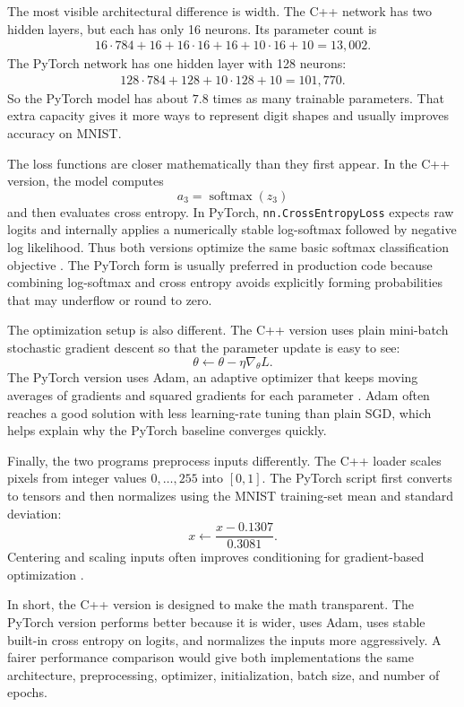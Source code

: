 \documentclass[11pt]{article}
\newcommand{\softmax}{\operatorname{softmax}}
\begin{document}
The most visible architectural difference is width. The C++ network has two
hidden layers, but each has only 16 neurons. Its parameter count is
\[
\begin{aligned}
    16 \cdot 784 + 16
    + 16 \cdot 16 + 16
    + 10 \cdot 16 + 10
    = 13{,}002.
\end{aligned}
\]
The PyTorch network has one hidden layer with 128 neurons:
\[
\begin{aligned}
    128 \cdot 784 + 128
    + 10 \cdot 128 + 10
    = 101{,}770.
\end{aligned}
\]
So the PyTorch model has about $7.8$ times as many trainable parameters. That
extra capacity gives it more ways to represent digit shapes and usually improves
accuracy on MNIST.

The loss functions are closer mathematically than they first appear. In the C++
version, the model computes
\[
    a_3 = \softmax(z_3)
\]
and then evaluates cross entropy. In PyTorch, \texttt{nn.CrossEntropyLoss} expects
raw logits and internally applies a numerically stable log-softmax followed by
negative log likelihood. Thus both versions optimize the same basic softmax
classification objective \cite{bishop2006pattern,goodfellow2016deep}. The PyTorch
form is usually preferred in production code because combining log-softmax and
cross entropy avoids explicitly forming probabilities that may underflow or round
to zero.

The optimization setup is also different. The C++ version uses plain mini-batch
stochastic gradient descent so that the parameter update is easy to see:
\[
    \theta \leftarrow \theta - \eta \nabla_\theta L.
\]
The PyTorch version uses Adam, an adaptive optimizer that keeps moving averages
of gradients and squared gradients for each parameter \cite{kingma2015adam}.
Adam often reaches a good solution with less learning-rate tuning than plain SGD,
which helps explain why the PyTorch baseline converges quickly.

Finally, the two programs preprocess inputs differently. The C++ loader scales
pixels from integer values $0,\ldots,255$ into $[0,1]$. The PyTorch script first
converts to tensors and then normalizes using the MNIST training-set mean and
standard deviation:
\[
    x \leftarrow \frac{x - 0.1307}{0.3081}.
\]
Centering and scaling inputs often improves conditioning for gradient-based
optimization \cite{goodfellow2016deep}.

In short, the C++ version is designed to make the math transparent. The PyTorch
version performs better because it is wider, uses Adam, uses stable built-in
cross entropy on logits, and normalizes the inputs more aggressively. A fairer
performance comparison would give both implementations the same architecture,
preprocessing, optimizer, initialization, batch size, and number of epochs.
\end{document}
